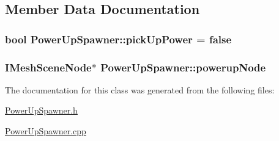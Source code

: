 \subsection{Member Data Documentation}
\hypertarget{class_power_up_spawner_afa1bc4eb2e260ef8a3ca62664867ad75}{
\subsubsection[{pick\-Up\-Power}]{\setlength{\rightskip}{0pt plus 5cm}bool Power\-Up\-Spawner\-::pick\-Up\-Power = false}}\label{class_power_up_spawner_afa1bc4eb2e260ef8a3ca62664867ad75}
\hypertarget{class_power_up_spawner_a0bf84727961b4a9239408026f8b392e6}{
\subsubsection[{powerup\-Node}]{\setlength{\rightskip}{0pt plus 5cm}I\-Mesh\-Scene\-Node$\ast$ Power\-Up\-Spawner\-::powerup\-Node}}\label{class_power_up_spawner_a0bf84727961b4a9239408026f8b392e6}


The documentation for this class was generated from the following files\-:\begin{DoxyCompactItemize}
\item 
\hyperlink{_power_up_spawner_8h}{Power\-Up\-Spawner.\-h}\item 
\hyperlink{_power_up_spawner_8cpp}{Power\-Up\-Spawner.\-cpp}\end{DoxyCompactItemize}
